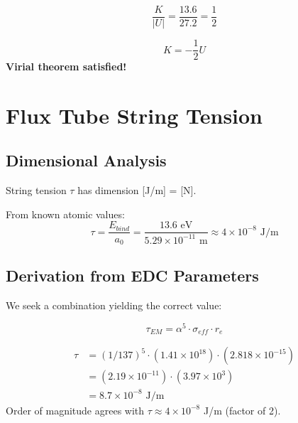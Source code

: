 \documentclass[12pt,a4paper]{article}
\begin{document}
\begin{equation}
\frac{K}{|U|} = \frac{13.6}{27.2} = \frac{1}{2}
\end{equation}

\begin{keyresult}
\begin{equation}
\boxed{K = -\frac{1}{2}U}
\end{equation}
\textbf{Virial theorem satisfied!}
\end{keyresult}

\section{Flux Tube String Tension}

\subsection{Dimensional Analysis}

String tension $\tau$ has dimension [J/m] = [N].

From known atomic values:
\begin{equation}
\tau = \frac{E_{bind}}{a_0} = \frac{13.6 \text{ eV}}{5.29 \times 10^{-11} \text{ m}} \approx 4 \times 10^{-8} \text{ J/m}
\end{equation}

\subsection{Derivation from EDC Parameters}

We seek a combination yielding the correct value:

\begin{keyresult}
\begin{equation}
\boxed{\tau_{EM} = \alpha^5 \cdot \sigma_{eff} \cdot r_e}
\end{equation}
\end{keyresult}

\begin{numericalcheck}
\begin{align*}
\tau &= (1/137)^5 \cdot (1.41 \times 10^{18}) \cdot (2.818 \times 10^{-15}) \\
&= (2.19 \times 10^{-11}) \cdot (3.97 \times 10^{3}) \\
&= 8.7 \times 10^{-8} \text{ J/m}
\end{align*}
Order of magnitude agrees with $\tau \approx 4 \times 10^{-8}$ J/m (factor of 2). \checkmark
\end{numericalcheck}
\end{document}
